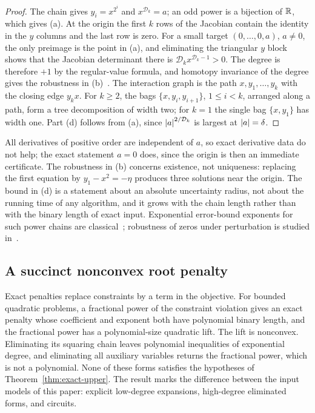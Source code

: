 \begin{proof}
The chain gives $y_i=x^{2^i}$ and $x^{\mathcal D_k}=a$; an odd power is a
bijection of $\mathbb R$, which gives (a). At the origin the first $k$ rows of the
Jacobian contain the identity in the $y$ columns and the last row is zero.
For a small target $(0,\ldots,0,a)$, $a\ne0$, the only preimage is the point
in (a), and eliminating the triangular $y$ block shows that the Jacobian
determinant there is $\mathcal D_kx^{\mathcal D_k-1}>0$. The degree is therefore
$+1$ by the regular-value formula, and homotopy invariance of the degree gives
the robustness in (b)~\cite{Deimling1985}. The interaction graph is the path
$x,y_1,\ldots,y_k$ with the closing edge $y_kx$. For $k\ge2$, the bags
$\{x,y_i,y_{i+1}\}$, $1\le i<k$, arranged along a path, form a tree
decomposition of width two; for $k=1$ the single bag $\{x,y_1\}$ has width
one. Part (d) follows
from (a), since $\left\lvert a\right\rvert^{2/\mathcal D_k}$ is largest at $\left\lvert a\right\rvert=\delta$.
\end{proof}

All derivatives of positive order are independent of $a$, so exact
derivative data do not help; the exact statement $a=0$ does, since the origin
is then an immediate certificate. The robustness in (b) concerns existence,
not uniqueness: replacing the first equation by $y_1-x^2=-\eta$ produces three
solutions near the origin. The bound in (d) is a statement about an absolute
uncertainty radius, not about the running time of any algorithm, and it
grows with the chain length rather than with the binary length of exact
input. Exponential error-bound exponents for such power chains are
classical~\cite{Kollar1999}; robustness of zeros under perturbation is
studied in~\cite{FranekRatschanZgliczynski2016}.

\subsection{A succinct nonconvex root penalty}
\label{app:bnd-penalty}

Exact penalties replace constraints by a term in the objective. For bounded
quadratic problems, a fractional power of the constraint violation gives an
exact penalty whose coefficient and exponent both have polynomial binary
length, and the fractional power has a polynomial-size quadratic lift. The
lift is nonconvex. Eliminating its squaring chain leaves polynomial
inequalities of exponential degree, and eliminating all auxiliary variables
returns the fractional power, which is not a polynomial. None of these forms
satisfies the hypotheses of Theorem~\ref{thm:exact-upper}. The result marks
the difference between the input models of this paper: explicit low-degree
expansions, high-degree eliminated forms, and circuits.

